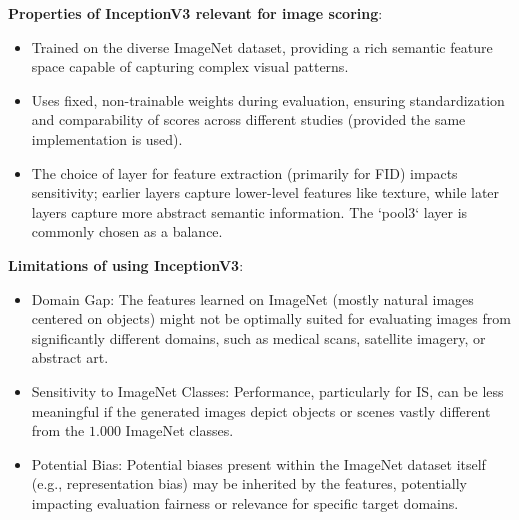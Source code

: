 \noindent\textbf{Properties of InceptionV3 relevant for image scoring}:
\begin{itemize}
    \item Trained on the diverse ImageNet dataset, providing a rich semantic feature space capable of capturing complex visual patterns.
    \item Uses fixed, non-trainable weights during evaluation, ensuring standardization and comparability of scores across different studies (provided the same implementation is used).
    \item The choice of layer for feature extraction (primarily for FID) impacts sensitivity; earlier layers capture lower-level features like texture, while later layers capture more abstract semantic information. The `pool3` layer is commonly chosen as a balance.
\end{itemize}

\noindent\textbf{Limitations of using InceptionV3}:\label{theoretical_inception_model_limitaitions}
\begin{itemize}
    \item Domain Gap: The features learned on ImageNet (mostly natural images centered on objects) might not be optimally suited for evaluating images from significantly different domains, such as medical scans, satellite imagery, or abstract art.
    \item Sensitivity to ImageNet Classes: Performance, particularly for IS, can be less meaningful if the generated images depict objects or scenes vastly different from the $1.000$ ImageNet classes.
    \item Potential Bias: Potential biases present within the ImageNet dataset itself (e.g., representation bias) may be inherited by the features, potentially impacting evaluation fairness or relevance for specific target domains.
\end{itemize}



\newpage
